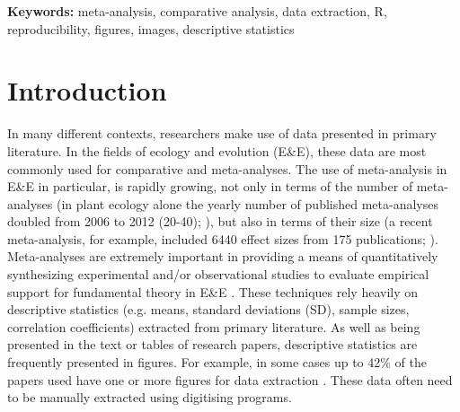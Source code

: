\documentclass[12pt]{article}
\let\proglang=\textsf
\begin{document}
\vskip10pt
 \textbf{Keywords:} meta-analysis, comparative analysis, data extraction, \proglang{R}, reproducibility, figures, images, descriptive statistics




\clearpage



\section{Introduction}

In many different contexts, researchers make use of data presented in primary literature. In the fields of ecology and evolution (E\&E), these data are most commonly used for comparative and meta-analyses. The use of meta-analysis in E\&E in particular, is rapidly growing, not only in terms of the number of meta-analyses (in plant ecology alone the yearly number of published meta-analyses doubled from 2006 to 2012 (20-40); \cite{Koricheva2014}), but also in terms of their size (a recent meta-analysis, for example, included 6440 effect sizes from 175 publications; \cite{Noble2018}). Meta-analyses are extremely important in providing a means of quantitatively synthesizing experimental and/or observational studies to evaluate empirical support for fundamental theory in E\&E \citep{Gurevitch2018}. These techniques rely heavily on descriptive statistics (e.g. means, standard deviations (SD), sample sizes, correlation coefficients) extracted from primary literature. As well as being presented in the text or tables of research papers, descriptive statistics are frequently presented in figures. For example, in some cases up to 42\% of the papers used have one or more figures for data extraction \cite{Noble2018}. These data often need to be manually extracted using digitising programs. 
\end{document}
